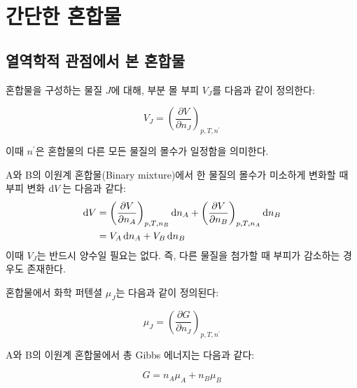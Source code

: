 \chapter{간단한 혼합물}
    \section{열역학적 관점에서 본 혼합물}
        \hspace{\parindent}혼합물을 구성하는 물질 $J$에 대해, 부분 몰 부피 $V_J$를 다음과 같이 정의한다:
        \begin{defn}[부분 몰 부피]
        \begin{equation*}
            V_J = \left(\frac{\partial V}{\partial n_J}\right)_{p,T,n^\prime}
        \end{equation*}
        \end{defn}
        이때 $n^\prime$은 혼합물의 다른 모든 물질의 몰수가 일정함을 의미한다.
        \par A와 B의 이원계 혼합물(Binary mixture)에서 한 물질의 몰수가 미소하게 변화할 때 부피 변화 $\operatorname{d\!} V$는 다음과 같다:
        \begin{equation*}
            \begin{aligned}
                \operatorname{d\!} V &= \left(\frac{\partial V}{\partial n_A}\right)_{p,T,n_B}\operatorname{d\!} n_A + \left(\frac{\partial V}{\partial n_B}\right)_{p,T,n_A}\operatorname{d\!} n_B\\
                &= V_A \operatorname{d\!} n_A + V_B \operatorname{d\!} n_B
            \end{aligned}
        \end{equation*}
        이때 $V_J$는 반드시 양수일 필요는 없다. 즉, 다른 물질을 첨가할 때 부피가 감소하는 경우도 존재한다.
        \par 혼합물에서 화학 퍼텐셜 $\mu_J$는 다음과 같이 정의된다:
        \begin{defn}
        \begin{equation*}
            \mu_J = \left(\frac{\partial G}{\partial n_J}\right)_{p,T,n^\prime}
        \end{equation*}
        \end{defn}
        A와 B의 이원계 혼합물에서 총 Gibbs 에너지는 다음과 같다:
        \begin{fact}\label{binarygibbs}
        \begin{equation*}
            G = n_A \mu_A + n_B \mu_B
        \end{equation*}
        \end{fact}
